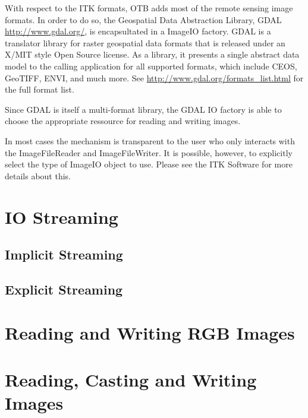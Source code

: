 With respect to the ITK formats, OTB adds most of the remote sensing
image formats. In order to do so, the Geospatial Data Abstraction Library, GDAL
      \url{http://www.gdal.org/}, is encapsultated in a ImageIO
      factory. GDAL is a translator library for raster
      geospatial data formats that is released under an X/MIT style
      Open Source license. As a library, it presents a single abstract
      data model to the calling application for all supported formats,
      which include CEOS, GeoTIFF, ENVI, and much more. See
      \url{http://www.gdal.org/formats_list.html} for
      the full format list.

      Since GDAL is itself a multi-format library, the GDAL IO
factory is able to choose the appropriate ressource for reading and
writing images.

In most cases the mechanism is transparent to the user who only interacts
with the ImageFileReader and ImageFileWriter. It is
possible, however, to explicitly select the type of ImageIO object
to use.  Please see the ITK Software for more details about this.

%

\section{IO Streaming}
\label{sec:IOStreaming}
\subsection{Implicit Streaming}
\label{sec:ImplicitIOStreaming}


\subsection{Explicit Streaming}
\label{sec:ExplicitIOStreaming}



\section{Reading and Writing RGB Images}
\label{sec:RGBImagReadWrite}


\section{Reading, Casting and Writing Images}
\label{sec:ImagReadCastWrite}


